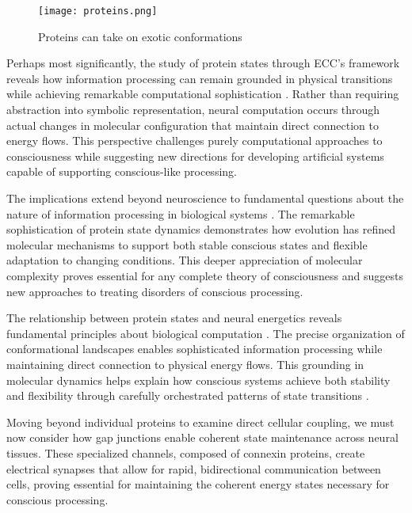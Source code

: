 \begin{figure}[h]
    \centering
    \texttt{[image: proteins.png]}

    \caption{Proteins can take on exotic conformations}
\end{figure}

Perhaps most significantly, the study of protein states through ECC's framework reveals how information processing can remain grounded in physical transitions while achieving remarkable computational sophistication \cite{Oldfield2014}. Rather than requiring abstraction into symbolic representation, neural computation occurs through actual changes in molecular configuration that maintain direct connection to energy flows. This perspective challenges purely computational approaches to consciousness while suggesting new directions for developing artificial systems capable of supporting conscious-like processing.

The implications extend beyond neuroscience to fundamental questions about the nature of information processing in biological systems \cite{Davis2018}. The remarkable sophistication of protein state dynamics demonstrates how evolution has refined molecular mechanisms to support both stable conscious states and flexible adaptation to changing conditions. This deeper appreciation of molecular complexity proves essential for any complete theory of consciousness and suggests new approaches to treating disorders of conscious processing.

The relationship between protein states and neural energetics reveals fundamental principles about biological computation \cite{Erickson2009}. The precise organization of conformational landscapes enables sophisticated information processing while maintaining direct connection to physical energy flows. This grounding in molecular dynamics helps explain how conscious systems achieve both stability and flexibility through carefully orchestrated patterns of state transitions \cite{Royer2006}.

Moving beyond individual proteins to examine direct cellular coupling, we must now consider how gap junctions enable coherent state maintenance across neural tissues. These specialized channels, composed of connexin proteins, create electrical synapses that allow for rapid, bidirectional communication between cells, proving essential for maintaining the coherent energy states necessary for conscious processing.